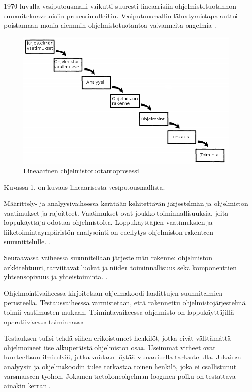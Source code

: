 \documentclass[finnish]{tktltiki2}
\theoremstyle{definition}
\theoremstyle{remark}
\begin{document}
1970-luvulla vesiputousmalli vaikutti suuresti lineaarisiin ohjelmistotuotannon suunnitelmavetoisiin prosessimalleihin. Vesiputousmallin lähestymistapa auttoi poistamaan monia aiemmin ohjelmistotuotantoa vaivanneita ongelmia \cite{BOE88}.

\begin{figure}[h!]
  \caption{Lineaarinen ohjelmistotuotantoprosessi}
  \centering
    \includegraphics[width=\textwidth]{waterfall}
\end{figure}

Kuvassa 1. on kuvaus lineaarisesta vesiputousmallista.

Määrittely- ja analyysivaiheessa kerätään kehitettävän järjestelmän ja ohjelmiston vaatimukset ja rajoitteet. Vaatimukset ovat joukko toiminnallisuuksia, joita loppukäyttäjä odottaa ohjelmistolta. Loppukäyttäjien vaatimuksien ja liiketoimintaympäristön analysointi on edellytys ohjelmiston rakenteen suunnittelulle. \cite{ROY70}.

Seuraavassa vaiheessa suunnitellaan järjestelmän rakenne: ohjelmiston arkkitehtuuri, tarvittavat luokat ja niiden toiminnallisuus sekä komponenttien yhteensopivuus ja yhteistoiminta. \cite{ROY70}.

Ohjelmointivaiheessa kirjoitetaan ohjelmakoodi laadittujen suunnitelmien perusteella. Testausvaiheessa varmistetaan, että rakennettu ohjelmistojärjestelmä toimii vaatimusten mukaan. Toimintavaiheessa ohjelmisto on loppukäyttäjillä operatiivisessa toiminnassa \cite{ROY70}. 

Testauksen tulisi tehdä siihen erikoistuneet henkilöt, jotka eivät välttämättä ohjelmoineet itse alkuperäistä ohjelmiston osaa. Useimmat virheet ovat luonteeltaan ilmiselviä, jotka voidaan löytää visuaalisella tarkastelulla. Jokaisen analyysin ja ohjelmakoodin tulee tarkastaa toinen henkilö, joka ei osallistunut varsinaiseen työhön. Jokainen tietokoneohjelman looginen polku on testattava ainakin kerran \cite{ROY70}.
\end{document}
